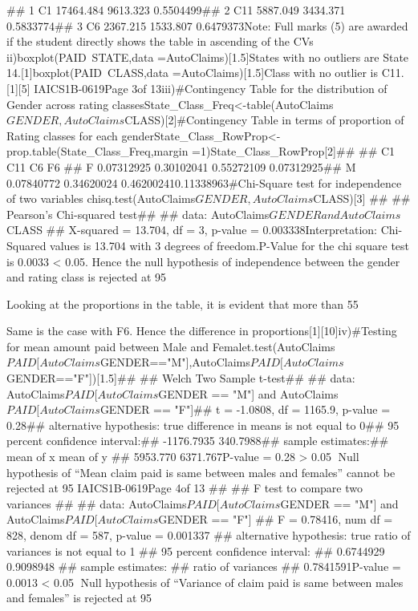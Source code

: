## 1   C1  17464.484 9613.323 0.5504499## 2   C11  5887.049 3434.371 0.5833774## 3   C6   2367.215 1533.807 0.6479373Note: Full marks (5) are awarded if the student directly shows the table in ascending of the CVs ii)boxplot(PAID~STATE,data =AutoClaims)[1.5]States with no outliers are State 14.[1]boxplot(PAID~CLASS,data =AutoClaims)[1.5]Class with no outlier is C11.[1][5]
IAICS1B-0619Page 3of 13iii)#Contingency Table for the distribution of Gender across rating classesState_Class_Freq<-table(AutoClaims$GENDER,AutoClaims$CLASS)[2]#Contingency Table in terms of proportion of Rating classes for each genderState_Class_RowProp<-prop.table(State_Class_Freq,margin =1)State_Class_RowProp[2]##    ##            C1         C11        C6         F6 ##   F 0.07312925 0.30102041 0.55272109 0.07312925##   M 0.07840772 0.34620024 0.462002410.11338963#Chi-Square test for independence of two variables chisq.test(AutoClaims$GENDER,AutoClaims$CLASS)[3]
## 
##  Pearson's Chi-squared test## ## data:  AutoClaims$GENDER and AutoClaims$CLASS
## X-squared = 13.704, df = 3, p-value = 0.003338Interpretation: Chi-Squared values is 13.704 with 3 degrees of freedom.P-Value for the chi square test is 0.0033 < 0.05. Hence the null hypothesis of independence between the gender and rating class is rejected at 95%

Looking at the proportions in the table, it is evident that more than 55%

Same is the case with F6. Hence the difference in proportions[1][10]iv)#Testing for mean amount paid between Male and Femalet.test(AutoClaims$PAID[AutoClaims$GENDER=="M"],AutoClaims$PAID[AutoClaims$GENDER=="F"])[1.5]## ##  Welch Two Sample t-test## ## data:  AutoClaims$PAID[AutoClaims$GENDER == "M"] and AutoClaims$PAID[AutoClaims$GENDER == "F"]## t = -1.0808, df = 1165.9, p-value = 0.28## alternative hypothesis: true difference in means is not equal to 0## 95 percent confidence interval:##  -1176.7935   340.7988## sample estimates:## mean of x mean of y ##  5953.770  6371.767P-value = 0.28 > 0.05 Null hypothesis of “Mean claim paid is same between males and females” cannot be rejected at 95%
IAICS1B-0619Page 4of 13
## 
##  F test to compare two variances
## 
## data:  AutoClaims$PAID[AutoClaims$GENDER == "M"] and AutoClaims$PAID[AutoClaims$GENDER == "F"]
## F = 0.78416, num df = 828, denom df = 587, p-value = 0.001337
## alternative hypothesis: true ratio of variances is not equal to 1
## 95 percent confidence interval:
##  0.6744929 0.9098948
## sample estimates:
## ratio of variances 
##          0.7841591P-value = 0.0013 < 0.05 Null hypothesis of “Variance of claim paid is same between males and females” is rejected at 95%

